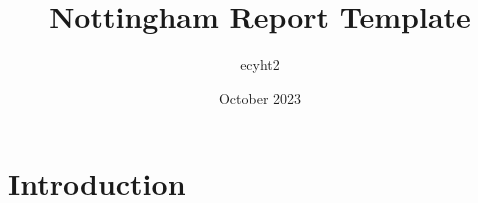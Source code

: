\documentclass{article}
\title{Nottingham Report Template}
\author{ecyht2 }
\date{October 2023}
\begin{document}
\maketitle

\section{Introduction}
\end{document}
